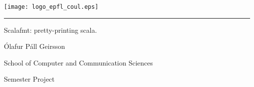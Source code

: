
%        




\newcommand{\logoepfl}[0]{
  \begin{center}
    \texttt{[image: logo\_epfl\_coul.eps]}
  \end{center}
  \vspace{0.3cm}
  \hrule
}
\newcommand{\logolasec}[0]{
  \vspace{1cm}
  \hrule
  \begin{center}
    \texttt{[image: logo\_lasec\_coul.eps]}
  \end{center}
}
\newcommand{\project}[1]{
  \begin{center}
    \large{#1}
  \end{center}
  \vspace{1cm}
}
\newcommand{\department}[1]{
  \begin{center}
    \large{#1}
  \end{center}
}
\newcommand{\supervisor}[3]{
  \begin{center}
    \begin{normalsize}{
        \bf #1}\\#2\\#3
    \end{normalsize}
  \end{center}
}
\renewcommand{\author}[1]{
  \begin{center}
    \Large{#1}
  \end{center}
  \vspace{0.5cm}
}
\renewcommand{\title}[1]{
  \vspace{3cm}
  \begin{center}
    \huge{#1}
  \end{center}
  \vspace{1.7cm}
}
\renewcommand{\date}[2]{
  \begin{center}
    \normalsize{#1 #2}
  \end{center}
  \vspace{0.5cm}
}


\thispagestyle{empty}


  \logoepfl

  \title{Scalafmt: pretty-printing scala.}

  \author{Ólafur Páll Geirsson}
  \department{School of Computer and Communication Sciences}
  \project{Semester Project}

